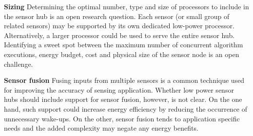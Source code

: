 {\bf Sizing} Determining the optimal number, type and size of
processors to include in the sensor hub is an open research question.
Each sensor (or small group of related sensors) may be supported by
its own dedicated low-power processor. Alternatively, a larger
processor could be used to serve the entire sensor hub.  Identifying a
sweet spot between the maximum number of concurrent algorithm
executions, energy budget, cost and physical size of the sensor node
is an open challenge.

{\bf Sensor fusion} Fusing inputs from multiple sensors is a common
technique used for improving the accuracy of sensing application.
Whether low power sensor hubs should include support for sensor
fusion, however, is not clear.  On the one hand, such support could
increase energy efficiency by reducing the occurrence of unnecessary
wake-ups.  On the other, sensor fusion tends to application specific
needs and the added complexity may negate any energy benefits.


\vspace{10 mm}


